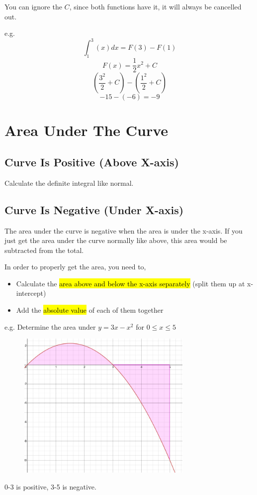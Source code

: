 \documentclass[a4paper,12pt]{article}
\begin{document}
You can ignore the $C$, since both functions have it, it will always be cancelled out.

e.g. $$\int^3_1{(x)}dx = F(3) - F(1)$$
$$F(x) = \frac{1}{2}x^2 + C$$
$$(\frac{3^2}{2} + C) - (\frac{1^2}{2} + C)$$
$$-15 - (-6) = -9$$

\section{Area Under The Curve}
\subsection{Curve Is Positive (Above X-axis)}
Calculate the definite integral like normal.

\subsection{Curve Is Negative (Under X-axis)}
The area under the curve is negative when the area is under the x-axis. If you just get the area under the curve normally like above, this area would be subtracted from the total.

In order to properly get the area, you need to,
\begin{itemize}
    \item{Calculate the \hl{area above and below the x-axis separately} (split them up at x-intercept)}
    \item{Add the \hl{absolute value} of each of them together}
\end{itemize}

e.g. Determine the area under $y = 3x - x^2$ for $0 \leq x \leq 5$
\begin{figure}[H]
    \centering
    \includegraphics[width=0.75\textwidth]{negative}
\end{figure}
0-3 is positive, 3-5 is negative.
\end{document}
